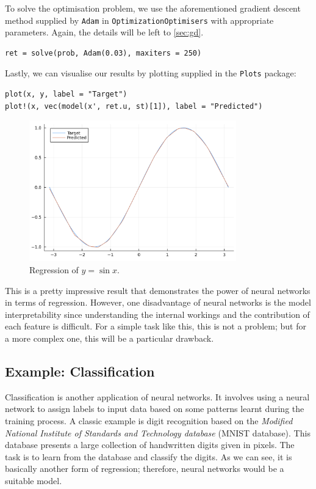 \documentclass[a4paper,11pt,titlepage]{article}
\theoremstyle{definition}
\theoremstyle{plain}
\theoremstyle{remark}
\begin{document}
To solve the optimisation problem, we use the aforementioned gradient descent method supplied by \verb|Adam| in \verb|OptimizationOptimisers| with appropriate parameters. Again, the details will be left to \ref{sec:gd}.

\begin{verbatim}
ret = solve(prob, Adam(0.03), maxiters = 250)
\end{verbatim}

Lastly, we can visualise our results by plotting supplied in the \verb|Plots| package:

\begin{verbatim}
plot(x, y, label = "Target")
plot!(x, vec(model(x', ret.u, st)[1]), label = "Predicted")
\end{verbatim}

\begin{figure}[htbp]
    \centering
    \includegraphics[width=0.8\textwidth]{figures/Regression.png}
    \caption{Regression of $y = \sin x$.}
\end{figure}

This is a pretty impressive result that demonstrates the power of neural networks in terms of regression. However, one disadvantage of neural networks is the model interpretability since understanding the internal workings and the contribution of each feature is difficult. For a simple task like this, this is not a problem; but for a more complex one, this will be a particular drawback.

\subsection{Example: Classification}
\label{sec:cla}

Classification is another application of neural networks. It involves using a neural network to assign labels to input data based on some patterns learnt during the training process. A classic example is digit recognition based on the \textit{Modified National Institute of Standards and Technology database} (MNIST database). This database presents a large collection of handwritten digits given in pixels. The task is to learn from the database and classify the digits. As we can see, it is basically another form of regression; therefore, neural networks would be a suitable model.
\end{document}
